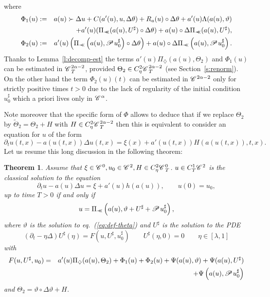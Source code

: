 \documentclass[11pt,reqno]{amsart}
\newcommand{\assign}{:=}
\newcommand{\nocomma}{}
\newcommand{\precprec}{\prec\!\!\!\prec}
\newtheorem{theorem}{Theorem}
\newcommand{\CC}{\mathscr{C} \hspace{.1em}}
\newcommand{\PP}{\mathscr{P} \hspace{.1em}}
\begin{document}
where
\begin{eqnarray*}
  \Phi_1 (u) & \assign & a (u) \succ \Delta u + C (a' (u), u, \Delta \theta) +
  R_a (u) \circ \Delta \theta + a' (u) \Lambda (a (u), \vartheta)\\
  &  & + a' (u) (\Pi_{\precprec} (a (u), U^{\sharp}) \circ \Delta \theta) + a
  (u) \circ \Delta \Pi_{\precprec} (a (u), U^{\sharp}),\\
  \Phi_2 (u) & \assign & a' (u) \left( \Pi_{\precprec} \left( a (u), \PP
  u_0^{\sharp} \right) \circ \Delta \theta \right) + a (u) \circ \Delta
  \Pi_{\precprec} \left( a (u), \PP u_0^{\sharp} \right) .
\end{eqnarray*}
Thanks to Lemma~\ref{l:decomp-est} the terms $a' (u) \Pi_{\diamondsuit} (a
(u), \Theta_2)$ and $\Phi_1 (u)$ can be estimated in $\CC^{2 \alpha - 2}_T$,
provided $\Theta_2 \in C^2_{\eta} \CC^{2 \alpha - 2}_T$ (see
Section~\ref{s:renorm}). On the other hand the term $\Phi_2 (u) (t)$ can be
estimated in $\CC^{2 \alpha - 2}$ only for strictly positive times $t > 0$ due
to the lack of regularity of the initial condition $u_0^{\sharp}$ which a
priori lives only in $\CC^{\alpha}$.

Note moreover that the specific form of $\Phi$ allows to deduce that if we
replace $\Theta_2$ by $\tilde{\Theta}_2 = \Theta_2 + H$ with $H \in C_{\eta}^2
\CC^{2 \alpha - 2}_T$ then this is equivalent to consider an equation for $u$
of the form
\[ \partial_t u (t, x) - a (u (t, x)) \Delta u (t, x) = \xi (x) + a' (u (t,
   x)) H (a (u (t, x)), t, x) . \]
Let us resume this long discussion in the following theorem:

\begin{theorem}
  \label{th:identification}Assume that $\xi \in \CC^0, u_0 \in \CC^2, H \in
  C_{\eta}^2 \CC^0_T$. $u \in C^1_T \CC^2$ is the classical solution to the
  equation
  \[ \partial_t u - a (u) \Delta u = \xi + a' (u) h (a (u)), \qquad u (0) =
     u_0, \]
  up to time $T > 0$ if and only if
  \[ u = \Pi_{\precprec} \left( a (u), \vartheta + U^{\sharp} + \PP
     u_0^{\sharp} \right), \]
  where $\vartheta$ is the solution to eq.~(\ref{eq:def-theta}) and
  $U^{\sharp}$ is the solution to the PDE
  \begin{equation}
    (\partial_t - \eta \Delta) U^{\sharp} (\eta) = F (u, U^{\sharp},
    u_0^{\sharp}) \qquad U^{\sharp} (\eta, 0) = 0 \qquad \eta \in [\lambda, 1]
    \label{eq:pde-sharp}
  \end{equation}
  with
  \begin{eqnarray*}
    F (u, U^{\sharp}, u_0) & = & a' (u) \Pi_{\nocomma \diamondsuit} (a (u),
    \Theta_2) + \Phi_1 (u) + \Phi_2 (u) + \Psi (a (u), \vartheta) + \Psi (a
    (u), U^{\sharp})\\
    &  & + \Psi \left( a (u), \PP u_0^{\sharp} \right)
  \end{eqnarray*}
  and $\Theta_2 = \vartheta \circ \Delta \vartheta + H$.
\end{theorem}
\end{document}
